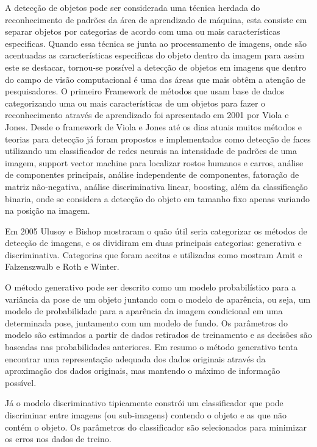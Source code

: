 A detecção de objetos pode ser considerada uma técnica herdada do reconhecimento de padrões da área de aprendizado de máquina, esta consiste em separar objetos por categorias de acordo com uma ou mais características especificas. Quando essa técnica se junta ao processamento de imagens, onde são acentuadas as características especificas do objeto dentro da imagem para assim este se destacar, tornou-se possível a detecção de objetos em imagens que dentro do campo de visão computacional é uma das áreas que mais obtêm a atenção de pesquisadores. O primeiro Framework de métodos que usam base de dados categorizando uma ou mais características de um objetos para fazer o reconhecimento através de aprendizado foi apresentado em 2001 por Viola e Jones\cite{Viola:2001}. Desde o framework de Viola e Jones até os dias atuais muitos métodos e teorias para detecção já foram propostos e implementados como detecção de faces utilizando um classificador de redes neurais na intensidade de padrões de uma imagem, support vector machine para localizar rostos humanos e carros\cite{Nascimento:2007}, análise de componentes principais, análise independente de componentes, fatoração de matriz não-negativa, análise discriminativa linear, boosting\cite{Roth:2008}, além da classificação binaria, onde se considera a detecção do objeto em tamanho fixo apenas variando na posição na imagem\cite{AmitFelzenszwalb:2014}. 

Em 2005 Ulusoy e Bishop\cite{Ulusoy:2005} mostraram o quão útil seria categorizar os métodos de detecção de imagens, e os dividiram em duas principais categorias: generativa e discriminativa. Categorias que foram aceitas e utilizadas como mostram Amit e Falzenszwalb\cite{AmitFelzenszwalb:2014} e Roth e Winter\cite{Roth:2008}.

O método generativo pode ser descrito como um modelo probabilístico para a variância da pose de um objeto juntando com o modelo de aparência, ou seja, um modelo de probabilidade para a aparência da imagem condicional em uma determinada pose, juntamento com um modelo de fundo. Os parâmetros do modelo são estimados a partir de dados retirados de treinamento e as decisões são baseadas nas probabilidades anteriores\cite{AmitFelzenszwalb:2014}. Em resumo o método generativo tenta encontrar uma representação adequada dos dados originais através da aproximação dos dados originais, mas mantendo o máximo de informação possível\cite{Roth:2008}.

Já o modelo discriminativo tipicamente constrói um classificador que pode discriminar entre imagens (ou sub-imagens) contendo o objeto e as que não contém o objeto. Os parâmetros do classificador são selecionados para minimizar os erros nos dados de treino\cite{AmitFelzenszwalb:2014}.


